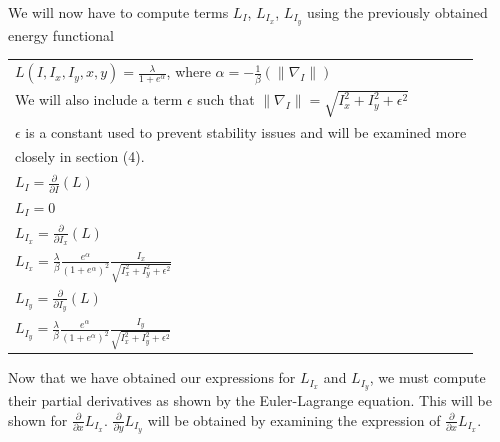 \documentclass{article}
\begin{document}
    \noindent
    We will now have to compute terms $L_{I}$, $L_{I_{x}}$, $L_{I_{y}}$ using the previously obtained energy functional
      \begin{center}
        \begin{tabular}{l}
          $L(I,I_{x},I_{y},x,y) = \frac{\lambda}{1+e^{\alpha}}$, where $\alpha = -\frac{1}{\beta}(\| \nabla_{I} \|)$\\
          We will also include a term $\epsilon$ such that $\| \nabla_{I} \| = \sqrt{I_{x}^2 + I_{y}^2 + \epsilon^2}$\\
          $\epsilon$ is a constant used to prevent stability issues and will be examined more\\
          \vspace{12pt}
          closely in section (4).\\
          $L_{I} = \frac{\partial}{\partial I}(L)$\\
          $L_{I} = 0$\\
          $L_{I_{x}} = \frac{\partial}{\partial I_{x}}(L)$\\
          $L_{I_{x}} = \frac{\lambda}{\beta} \frac{e^\alpha}{(1+e^{\alpha})^2} \frac{I_{x}}{\sqrt{I_{x}^2 + I_{y}^2 + \epsilon^2}}$\\
          $L_{I_{y}} = \frac{\partial}{\partial I_{y}}(L)$\\
          $L_{I_{y}} = \frac{\lambda}{\beta} \frac{e^\alpha}{(1+e^{\alpha})^2} \frac{I_{y}}{\sqrt{I_{x}^2 + I_{y}^2 + \epsilon^2}}$\\
        \end{tabular}
      \end{center}
      \vspace{12pt}

    \noindent
    Now that we have obtained our expressions for $L_{I_{x}}$ and $L_{I_{y}}$, we must compute their partial derivatives
    as shown by the Euler-Lagrange equation. This will be shown for $\frac{\partial}{\partial x}L_{I_{x}}$. $\frac{\partial}{\partial y}L_{I_{y}}$ will be obtained by examining
    the expression of $\frac{\partial}{\partial x}L_{I_{x}}$.\\
\end{document}
